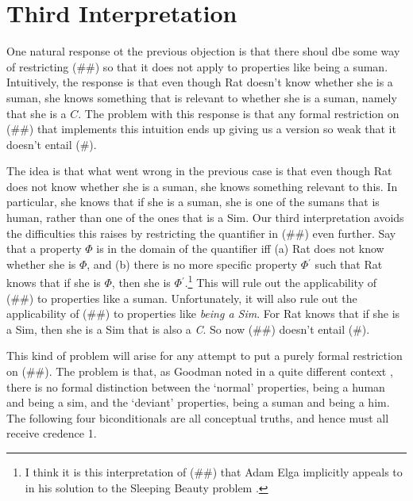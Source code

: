 \section{Third Interpretation}

One natural response ot the previous objection is that there shoul dbe some way of restricting (\#\#) so that it does not apply to properties like being a suman. Intuitively, the response is that even though Rat doesn't know whether she is a suman, she knows something that is relevant to whether she is a suman, namely that she is a \(C\). The problem with this response is that any formal restriction on (\#\#) that implements this intuition ends up giving us a version so weak that it doesn't entail (\#).

The idea is that what went wrong in the previous case is that even though Rat does not know whether she is a suman, she knows something relevant to this. In particular, she knows that if she is a suman, she is one of the sumans that is human, rather than one of the ones that is a Sim. Our third interpretation avoids the difficulties this raises by restricting the quantifier in (\#\#) even further. Say that a property ${\Phi}$ is in the domain of the quantifier iff (a) Rat does not know whether she is ${\Phi}$, and (b) there is no more specific property ${\Phi}$\(^\prime\) such that Rat knows that if she is ${\Phi}$, then she is ${\Phi}$\(^\prime\).\footnote{I think it is this interpretation of (\#\#) that Adam Elga implicitly appeals to in his solution to the Sleeping Beauty problem \citet{Elga2000-ELGSBA}.} This will rule out the applicability of (\#\#) to properties like a suman. Unfortunately, it will also rule out the applicability of (\#\#) to properties like \textit{being a Sim}. For Rat knows that if she is a Sim, then she is a Sim that is also a \textit{C}. So now (\#\#) doesn't entail (\#).

This kind of problem will arise for any attempt to put a purely formal restriction on (\#\#). The problem is that, as Goodman noted in a quite different context \citep{Goodman1955}, there is no formal distinction between the `normal' properties, being a human and being a sim, and the `deviant' properties, being a suman and being a him. The following four biconditionals are all conceptual truths, and hence must all receive credence 1.


